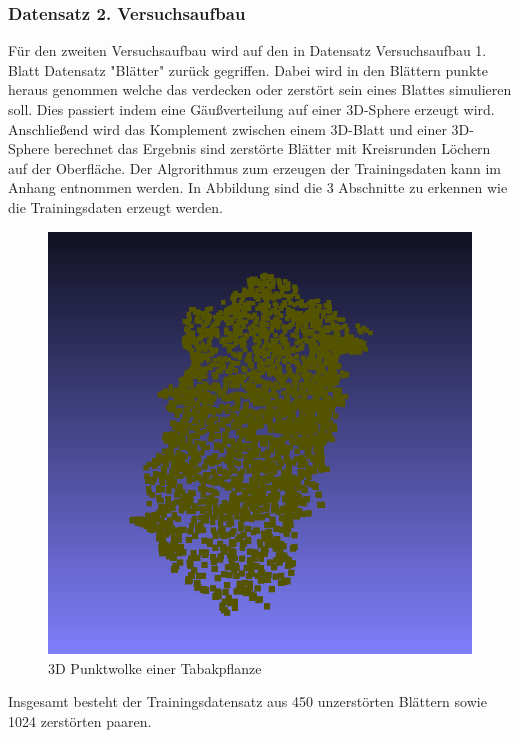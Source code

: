 \documentclass{llncs}
\begin{document}
\subsubsection{Datensatz 2. Versuchsaufbau}

Für den zweiten Versuchsaufbau wird auf den in Datensatz Versuchsaufbau 1. Blatt Datensatz "Blätter" zurück gegriffen. Dabei wird in den Blättern punkte heraus genommen welche das verdecken oder zerstört sein eines Blattes simulieren soll. Dies passiert indem eine Gäußverteilung auf einer 3D-Sphere erzeugt wird. Anschließend wird das Komplement zwischen einem 3D-Blatt und einer 3D-Sphere berechnet das Ergebnis sind zerstörte Blätter mit Kreisrunden Löchern auf der Oberfläche. Der Algrorithmus zum erzeugen der Trainingsdaten kann im Anhang entnommen werden. In Abbildung sind die 3 Abschnitte zu erkennen wie die Trainingsdaten erzeugt werden. 
\begin{figure}[htbp] 
	\centering
	\includegraphics[width=1.2\textwidth]{leaf1.png}
	\caption{3D Punktwolke einer Tabakpflanze}
	\label{fig:Bild2}
\end{figure}

Insgesamt besteht der Trainingsdatensatz aus 450 unzerstörten Blättern sowie 1024 zerstörten paaren. 
\end{document}
